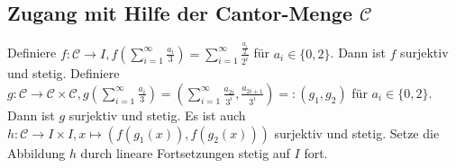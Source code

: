 \documentclass[a4paper,11pt,notitlepage]{report}
\begin{document}
\subsection{Zugang mit Hilfe der Cantor-Menge $\mathcal{C}$}
Definiere $f \colon \mathcal{C} \rightarrow I, f \left(\sum\limits_{i=1}^{\infty}{\frac{a_i}{3}} \right) = \sum\limits_{i=1}^{\infty}{\frac{\frac{a_i}{2}}{2^i}}$ für $a_i \in \{0,2\}$.
\newline
Dann ist $f$ surjektiv und stetig.
\newline
Definiere $g \colon \mathcal{C} \rightarrow \mathcal{C} \times \mathcal{C}, g \left(\sum\limits_{i=1}^{\infty}{\frac{a_i}{3}} \right) = \left(\sum\limits_{i=1}^{\infty}{\frac{a_{2i}}{3^i}}, \frac{a_{2i+1}}{3^i} \right)=:(g_1,g_2)$ für $a_i \in \{0,2\}$.
\newline
Dann ist $g$ surjektiv und stetig.
\newline
Es ist auch $h \colon \mathcal{C} \rightarrow I \times I, x \mapsto \left(f(g_1(x)), f(g_2(x))\right)$ surjektiv und stetig.
\newline
Setze die Abbildung $h$ durch lineare Fortsetzungen stetig auf $I$ fort.
\end{document}
